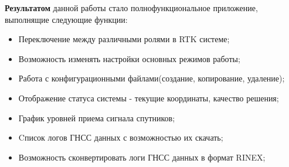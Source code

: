 \textbf{Результатом} данной работы стало полнофункциональное приложение, выполнящие следующие функции:
\begin{itemize}
  \item Переключение между различными ролями в RTK системе;
  \item Возможность изменять настройки основных режимов работы;
  \item Работа с конфигурационными файлами(создание, копирование, удаление);
  \item Отображение статуса системы - текущие координаты, качество решения;
  \item График уровней приема сигнала спутников;
  \item Cписок логов ГНСС данных с возможностью их скачать;
  \item Возможность сконвертировать логи ГНСС данных в формат RINEX;
\end{itemize}

